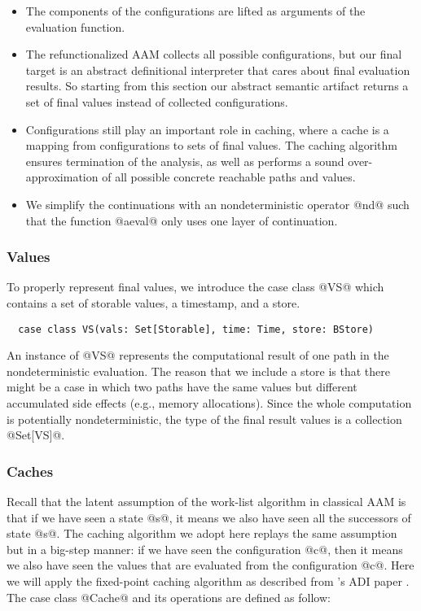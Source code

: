 \documentclass[acmsmall, review]{acmart}\settopmatter{}
\begin{document}
\begin{itemize}
  \item The components of the configurations are lifted as arguments of the evaluation
    function.
  \item The refunctionalized AAM collects all possible configurations, but our final target is an 
    abstract definitional interpreter that cares about final evaluation results.
    So starting from this section our abstract semantic artifact returns a set of final 
    values instead of collected configurations. 
  \item Configurations still play an important role in caching, where a cache
    is a mapping from configurations to sets of final values. The caching algorithm
    ensures termination of the analysis, as well as performs a sound over-approximation
    of all possible concrete reachable paths and values.
  \item We simplify the continuations with an nondeterministic operator @nd@ such 
    that the function @aeval@ only uses one layer of continuation.
\end{itemize}

\subsubsection{Values}
To properly represent final values, we introduce the case class @VS@ which
contains a set of storable values, a timestamp, and a store.

\begin{lstlisting}
  case class VS(vals: Set[Storable], time: Time, store: BStore)
\end{lstlisting}

An instance of @VS@ represents the computational result of one path in the nondeterministic 
evaluation. The reason that we include a store is that there might be a case in which two 
paths have the same values but different accumulated side effects (e.g., memory allocations).
Since the whole computation is potentially nondeterministic, the type of the final result
values is a collection @Set[VS]@.

\subsubsection{Caches}
Recall that the latent assumption of the work-list algorithm in classical AAM is that 
if we have seen a state @s@, it means we also have seen all the successors of state @s@.
The caching algorithm we adopt here replays the same assumption but in a big-step 
manner: if we have seen the configuration @c@, then it means we also have seen the 
values that are evaluated from the configuration @c@.
Here we will apply the fixed-point caching algorithm as described from
\citeauthor{darais2017abstracting}'s ADI paper \cite{darais2017abstracting}.
The case class @Cache@ and its operations are defined as follow:
\end{document}
